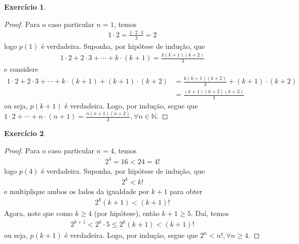 \documentclass[a4paper,12pt]{article}
\theoremstyle{definition}
\newtheorem{exercise}{Exercício}%
\begin{document}
	\begin{exercise}
		\begin{proof}
			Para o caso particular $n=1$, temos
			\begin{align*}
			1\cdot 2 = \frac{1\cdot 2\cdot 3}{3} = 2
			\end{align*}
			logo $p(1)$ é verdadeira. Suponha, por hipótese de indução, que 
			\begin{align*}
			1\cdot 2 + 2\cdot 3 + \cdots + k\cdot(k+1) = \frac{k(k+1)(k+2)}{3}
			\end{align*}
			e considere
			\begin{align*}
			1\cdot 2 + 2\cdot 3 + \cdots + k\cdot (k+1) + (k+1)\cdot (k+2) &= \frac{k(k+1)(k+2)}{3} + (k+1)\cdot (k+2) \\
			&= \frac{(k+1)(k+2)(k+3)}{3}
			\end{align*}
			ou seja, $p(k+1)$ é verdadeira. Logo, por indução, segue que $1\cdot 2 + \cdots + n\cdot (n+1) = \displaystyle{\frac{n(n+1)(n+2)}{3}}, \forall n\in\mathbb{N}$.
		\end{proof}
	\end{exercise}
	\begin{exercise}
		\begin{proof}
			Para o caso particular $n=4$, temos
			\begin{align*}
			2^4 = 16 < 24 = 4!
			\end{align*}
			logo $p(4)$ é verdadeira. Suponha, por hipótese de indução, que 
			\begin{align*}
			2^k < k!
			\end{align*} 
			e multiplique ambos os lados da igualdade por $k+1$ para obter
			\begin{align*}
			2^k(k+1) < (k+1)!
			\end{align*}
			Agora, note que como $k\geq 4$ (por hipótese), então $k+1\geq 5$. Daí, temos
			\begin{align*}
			2^{k+1} < 2^k\cdot 5 \leq 2^k(k+1) < (k+1)!
			\end{align*}
			ou seja, $p(k+1)$ é verdadeira. Logo, por indução, segue que $2^n < n!, \forall n\geq 4$.
		\end{proof}
	\end{exercise}
\end{document}
